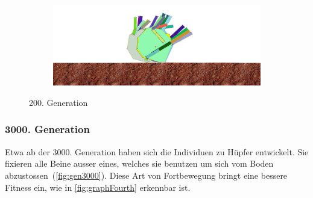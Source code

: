 \begin{figure}[H]
\begin{subfigure}[b]{0.45\textwidth}
                \includegraphics[width=\linewidth,center]{graphics/simulation-results/4_gen200_4}
                \caption{\label{fig:gen200_4}}
              \end{subfigure}
              \caption{200. Generation \label{fig:gen200}}
            \end{figure}


          \subsubsection{3000. Generation}
            Etwa ab der 3000. Generation haben sich die Individuen zu Hüpfer entwickelt.
            Sie fixieren alle Beine ausser eines, welches sie benutzen um sich vom Boden abzustossen~(\vref{fig:gen3000}).
            Diese Art von Fortbewegung bringt eine bessere Fitness ein, wie in \vref{fig:graphFourth} erkennbar ist.

            \vspace{0.5cm}

